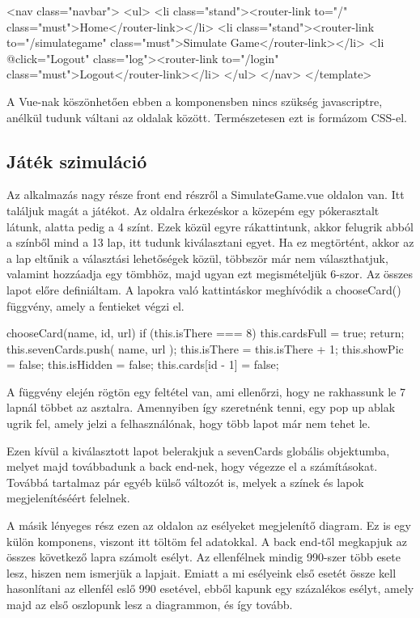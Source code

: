 \begin{python}
<nav class="navbar">
  <ul>
    <li class="stand"><router-link to="/" class="must">Home</router-link></li>
    <li class="stand"><router-link to="/simulategame" class="must">Simulate Game</router-link></li>
    <li @click="Logout" class="log"><router-link to="/login" class="must">Logout</router-link></li>
  </ul>
</nav>
</template>
\end{python}

A Vue-nak köszönhetően ebben a komponensben nincs szükség javascriptre, anélkül tudunk váltani az oldalak között. Természetesen ezt is formázom CSS-el.

\subsection{Játék szimuláció}
Az alkalmazás nagy része front end részről a SimulateGame.vue oldalon van. Itt találjuk magát a játékot. Az oldalra érkezéskor a közepém egy pókerasztalt látunk, alatta pedig a 4 színt. Ezek közül egyre rákattintunk, akkor felugrik abból a színből mind a 13 lap, itt tudunk kiválasztani egyet. Ha ez megtörtént, akkor az a lap eltűnik a választási lehetőségek közül, többször már nem választhatjuk, valamint hozzáadja egy tömbhöz, majd ugyan ezt megismételjük 6-szor. Az összes lapot előre definiáltam. A lapokra való kattintáskor meghívódik a chooseCard() függvény, amely a fentieket végzi el.

\begin{python}
    chooseCard(name, id, url) {
      if (this.isThere === 8) {
        this.cardsFull = true;
        return;
      }
      this.sevenCards.push({ name, url });
      this.isThere = this.isThere + 1;
      this.showPic = false;
      this.isHidden = false;
      this.cards[id - 1] = false;
    }
\end{python}

A függvény elején rögtön egy feltétel van, ami ellenőrzi, hogy ne rakhassunk le 7 lapnál többet az asztalra. Amennyiben így szeretnénk tenni, egy pop up ablak ugrik fel, amely jelzi a felhasználónak, hogy több lapot már nem tehet le.

Ezen kívül a kiválasztott lapot belerakjuk a sevenCards globális objektumba, melyet majd továbbadunk a back end-nek, hogy végezze el a számításokat. Továbbá tartalmaz pár egyéb külső változót is, melyek a színek és lapok megjelenítéséért felelnek.

A másik lényeges rész ezen az oldalon az esélyeket megjelenítő diagram. Ez is egy külön komponens, viszont itt töltöm fel adatokkal. A back end-től megkapjuk az összes következő lapra számolt esélyt. Az ellenfélnek mindig 990-szer több esete lesz, hiszen nem ismerjük a lapjait. Emiatt a mi esélyeink első esetét össze kell hasonlítani az ellenfél eslő 990 esetével, ebből kapunk egy százalékos esélyt, amely majd az első oszlopunk lesz a diagrammon, és így tovább. 

